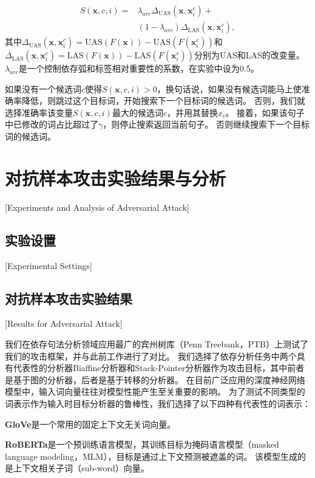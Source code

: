 \begin{equation}
	\begin{aligned}
		\label{eq:mis-inc}
		S(\bm{x},c,i) = & \lambda_{arc}\Delta_\text{UAS}(\bm{x},\bm{x}^c_{i}) + \\ 
		& (1-\lambda_{arc})\Delta_\text{LAS}(\bm{x},\bm{x}^c_{i}),
	\end{aligned}
\end{equation}
其中$\Delta_\text{UAS}(\bm{x},\bm{x}^c_{i}) = \text{UAS}(F(\bm{x})) - \text{UAS}(F(\bm{x}^c_{i})) $和$\Delta_\text{LAS}(\bm{x},\bm{x}^c_{i}) = \text{LAS}(F(\bm{x})) - \text{LAS}(F(\bm{x}^c_{i}))$分别为UAS和LAS的改变量。 
$\lambda_{arc}$是一个控制依存弧和标签相对重要性的系数，在实验中设为0.5。

如果没有一个候选词$c$使得$S(\bm{x},c,i) > 0$，换句话说，如果没有候选词能马上使准确率降低，则跳过这个目标词，开始搜索下一个目标词的候选词。
否则，我们就选择准确率该变量$S(\bm{x},c,i)$最大的候选词$c$，并用其替换$x_i$。
接着，如果该句子中已修改的词占比超过了$\gamma$，则停止搜索返回当前句子。
否则继续搜索下一个目标词的候选词。


\section{对抗样本攻击实验结果与分析}[Experiments and Analysis of Adversarial Attack]


\subsection{实验设置}[Experimental Settings]


\subsection{对抗样本攻击实验结果}[Results for Adversarial Attack]

我们在依存句法分析领域应用最广的宾州树库（Penn Treebank，PTB）上测试了我们的攻击框架，并与此前工作进行了对比。
我们选择了依存分析任务中两个具有代表性的分析器Biaffine分析器\cite{dozat2017deep}和Stack-Pointer分析器\cite{ma2018stack}作为攻击目标，其中前者是基于图的分析器，后者是基于转移的分析器。
在目前广泛应用的深度神经网络模型中，输入词向量往往对模型性能产生至关重要的影响。
为了测试不同类型的词表示作为输入时目标分析器的鲁棒性，我们选择了以下四种有代表性的词表示：

\textbf{GloVe}\cite{pennington2014glove}是一个常用的固定上下文无关词向量。

\textbf{RoBERTa}\cite{liu2019roberta}是一个预训练语言模型，其训练目标为掩码语言模型（masked language modeling，MLM），目标是通过上下文预测被遮盖的词。 该模型生成的是上下文相关子词（sub-word）向量。

